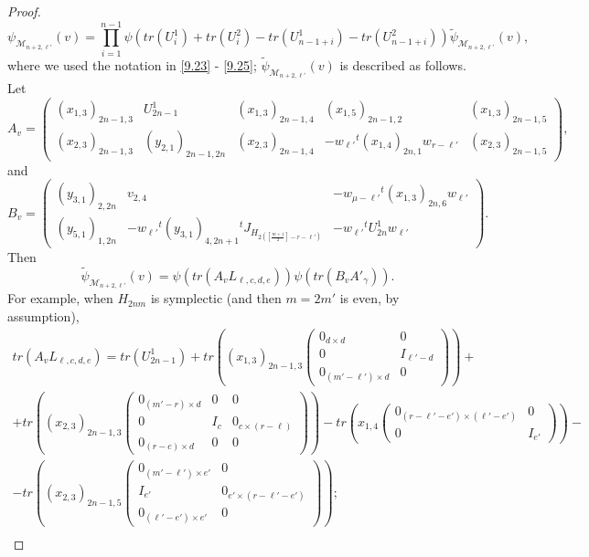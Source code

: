 \documentclass[12pts]{amsart}
\newcommand{\I}{{\mathrm{I}}}
\begin{document}
\begin{proof}
\begin{equation}
\psi_{\mathcal{M}_{n+2,\ell'}}(v)=\prod_{i=1}^{n-1}\psi(tr(U^1_i)+tr(U^2_i)-tr(U^1_{n-1+i})-tr(U^2_{n-1+i}))\tilde{\psi}_{\mathcal{M}_{n+2,\ell'}}(v),
\end{equation}
where we used the notation in \eqref{9.23} - \eqref{9.25}; $\tilde{\psi}_{\mathcal{M}_{n+2,\ell'}}(v)$ is described as follows. Let
\begin{equation}\label{9.82.1}
A_v=\begin{pmatrix}(x_{1,3})_{2n-1,3}&U_{2n-1}^1&(x_{1,3})_{2n-1,4}&(x_{1,5})_{2n-1,2}&(x_{1,3})_{2n-1,5}\\(x_{2,3})_{2n-1,3}&(y_{2,1})_{2n-1,2n}&(x_{2,3})_{2n-1,4}&-w_{\ell'}{}^t(x_{1,4})_{2n,1}w_{r-\ell'}&(x_{2,3})_{2n-1,5}\end{pmatrix},
\end{equation}
and
\begin{equation}\label{9.82.2}
B_v=\begin{pmatrix} (y_{3,1})_{2,2n}&v_{2,4}&-w_{\mu-\ell'}{}^t(x_{1,3})_{2n,6}w_{\ell'}\\(y_{5,1})_{1,2n}&-w_{\ell'}{}^t(y_{3,1})_{4,2n+1}{}^tJ_{H_{2([\frac{m+1}{2}]-r-\ell')}}&-w_{\ell'}{}^tU_{2n}^1w_{\ell'}\end{pmatrix}.
\end{equation}
Then
\begin{equation}\label{9.83}
\tilde{\psi}_{\mathcal{M}_{n+2,\ell'}}(v)=\psi(tr(A_vL_{\ell,c,d,e}))\psi(tr(B_v A'_\gamma)).
\end{equation}
For example, when $H_{2nm}$ is symplectic (and then $m=2m'$ is even, by assumption),
\begin{multline}\label{9.83.1}
tr(A_vL_{\ell,c,d,e})=tr(U_{2n-1}^1)+tr((x_{1,3})_{2n-1,3}\begin{pmatrix}0_{d\times d}&0\\0&I_{\ell'-d}\\0_{(m'-\ell')\times d}&0\end{pmatrix})+\\
+tr((x_{2,3})_{2n-1,3}\begin{pmatrix} 0_{(m'-r)\times d}&0&0\\0&I_c&0_{c\times (r-\ell)}\\0_{(r-c)\times d}&0&0\end{pmatrix})-tr(x_{1,4}\begin{pmatrix}0_{(r-\ell'-e')\times (\ell'-e')}&0\\0&I_{e'}\end{pmatrix})-\\
-tr((x_{2,3})_{2n-1,5}\begin{pmatrix}0_{(m'-\ell')\times e'}&0\\I_{e'}&0_{e'\times(r-\ell'-e')}\\0_{(\ell'-e')\times e'}&0\end{pmatrix});\\

\end{multline}
\end{proof}
\end{document}
